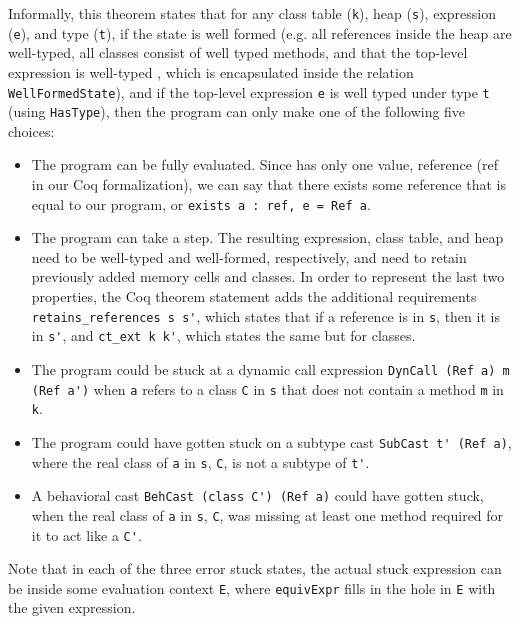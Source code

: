 \documentclass[acmsmall, anonymous, authordraft, review]{acmart} %
\begin{document}
Informally, this theorem states that for any class table (\verb|k|), heap
(\verb|s|), expression (\verb|e|), and type (\verb|t|), if the state is well
formed (e.g. all references inside the heap are well-typed, all  classes
consist of well typed methods, and that the top-level expression is well-typed
, which is encapsulated inside the relation \verb|WellFormedState|), and if
the top-level expression \verb|e| is well typed under type \verb|t| (using
\verb|HasType|), then the program can only make one of the following five
choices:

\begin{itemize}
  \item The program can be fully evaluated. Since \kafka has only one value,
  reference (ref in our Coq formalization), we can say that there exists some
  reference that is equal to our program, or \verb|exists a : ref, e = Ref a|.

  \item The program can take a step. The resulting expression, class table,
and heap need to be well-typed and well-formed, respectively, and need to
retain previously added memory cells and classes. In order to represent the
last two properties, the Coq theorem statement adds the additional
requirements \verb|retains_references s s'|, which states that if a reference
is in \verb|s|, then it is in \verb|s'|, and \verb|ct_ext k k'|, which
states the same but for classes.

  \item The program could be stuck at a dynamic call expression
\verb|DynCall (Ref a) m (Ref a')| when \verb|a| refers to a class
\verb|C| in \verb|s| that does not contain a method \verb|m| in 
\verb|k|.
  
  \item The program could have gotten stuck on a subtype cast \verb|SubCast t' (Ref a)|, 
where the real class of \verb|a| in \verb|s|, \verb|C|, is not a subtype of 
\verb|t'|.

  \item A behavioral cast \verb|BehCast (class C') (Ref a)| could have gotten
stuck, when the real class of \verb|a| in \verb|s|, \verb|C|, was missing at
least one method required for it to act like a \verb|C'|.
\end{itemize}

Note that in each of the three error stuck states, the actual stuck expression
can be inside some evaluation context \verb|E|, where \verb|equivExpr| fills 
in the hole in \verb|E| with the given expression.
\end{document}
